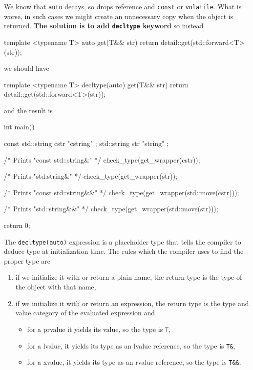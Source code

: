 \documentclass[../main]{subfiles}
\begin{document}
    We know that \texttt{auto} decays, so drops reference and
\texttt{const} or \texttt{volatile}. What is worse, in such cases we might
create an unnecessary copy when the object is returned.
\textbf{The solution is to add \texttt{decltype} keyword} so instead
\begin{Code}
    template <typename T>
    auto get(T&& str)
    {
        return detail::get(std::forward<T>(str));
    }
\end{Code}
we should have
\begin{Code}
    template <typename T>
    decltype(auto) get(T&& str)
    {
        return detail::get(std::forward<T>(str));
    }
\end{Code}
and the result is
\begin{Code}
    int main()
    {
        const std::string cstr { "cstring" };
        std::string str { "string" };

        /* Prints "const std::string&" */
        check_type(get_wrapper(cstr));

        /* Prints "std:string&" */
        check_type(get_wrapper(str));

        /* Prints "const std::string&&" */
        check_type(get_wrapper(std::move(cstr)));

        /* Prints "std::string&&" */
        check_type(get_wrapper(std::move(str)));
    
        return 0;
    }
\end{Code}

    The \texttt{decltype(auto)} expression is a placeholder type that tells the compiler to deduce type at initialization time.
The rules which the compiler uses to find the proper type are
\begin{enumerate}
    \item if we initialize it with or return a plain name, the return type is the type of the object with that name,
    \item if we initialize it with or return an expression, the return type is the type and value category of the evaluated expression and
    \begin{itemize}
        \item for a prvalue it yields its value, so the type is \texttt{T},
        \item for a lvalue, it yields its type as an lvalue reference, so the type is \texttt{T\&},
        \item for a xvalue, it yields its type as an rvalue reference, so the type is \texttt{T\&\&}.
    \end{itemize}
\end{enumerate}
\end{document}
